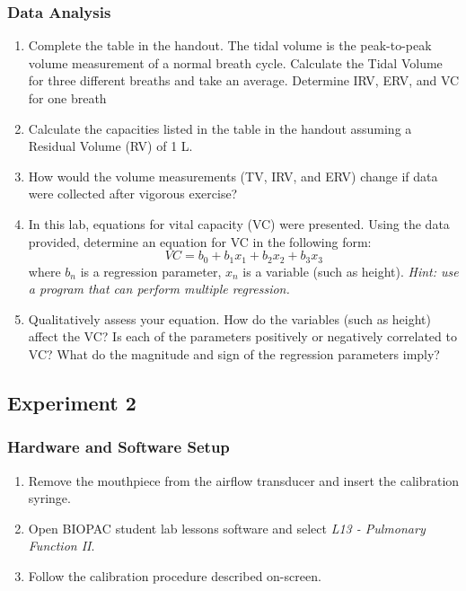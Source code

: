 \documentclass{article}
\begin{document}
\subsubsection*{Data Analysis}
\begin{enumerate}
	\item Complete the table in the handout. The tidal volume is the peak-to-peak volume measurement of a normal breath cycle. Calculate the Tidal Volume for three different breaths and take an average. Determine IRV, ERV, and VC for one breath
	\item Calculate the capacities listed in the table in the handout assuming a Residual Volume (RV) of 1 L.
	\item How would the volume measurements (TV, IRV, and ERV) change if data were collected after vigorous exercise?
	\item In this lab, equations for vital capacity (VC) were presented. Using the data provided, determine an equation for VC in the following form:\begin{equation}
		VC = b_0 + b_1x_1 + b_2x_2 + b_3x_3
	\end{equation}
	where $b_n$ is a regression parameter, $x_n$ is a variable (such as height). \textit{Hint: use a program that can perform multiple regression.}
	\item Qualitatively assess your equation. How do the variables (such as height) affect the VC? Is each of the parameters positively or negatively correlated to VC? What do the magnitude and sign of the regression parameters imply?
\end{enumerate}

\subsection*{Experiment 2}
\subsubsection*{Hardware and Software Setup}
\begin{enumerate}
	\item Remove the mouthpiece from the airflow transducer and insert the calibration syringe.
	\item Open BIOPAC student lab lessons software and select \textit{L13 - Pulmonary Function II}.
	\item Follow the calibration procedure described on-screen.
\end{enumerate}
\end{document}
